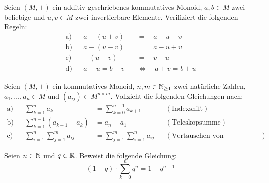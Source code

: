 \begin{aufg}
    Seien $(M,+)$ ein additiv geschriebenes kommutatives Monoid, $a,b\in M$ zwei beliebige und $u,v\in M$ zwei invertierbare Elemente. Verifiziert die folgenden Regeln:
    \begin{align*}
        \text{a)} && a-(u+v) \quad&=\quad a-u-v \\
        \text{b)} && a-(u-v) \quad&=\quad a-u+v \\
        \text{c)} && -(u-v) \quad&=\quad v-u \\
        \text{d)} && a-u=b-v \quad&\Leftrightarrow\quad a+v=b+u
    \end{align*}
\end{aufg}


\begin{comment}
\begin{aufg}[Kürzbarkeit]
    Sei $(M,*)$ ein Monoid. Ein Element $a\in M$ heißt \textbf{kürzbar}, wenn „Multiplikation mit $a$“ eine Äquivalenzumformung ist, d.h. wenn für alle $x,y\in M$ die beiden Äquivalenzen
    \begin{align*}
        a*x& =a*y \quad \leftrightarrow\quad x=y\\
        \text{und}\qquad x*a& =y*a \quad \leftrightarrow\quad x=y
    \end{align*}
    gelten.
    \begin{enumerate}
        \item Beweist, dass jedes invertierbare Element kürzbar ist.
        \item Ist ein kürzbares Element auch immer invertierbar?
    \end{enumerate}
\end{aufg}
\end{comment}


\begin{aufg}  
    Seien $(M,+)$ ein kommutatives Monoid, $n,m\in \mathbb N_{\ge 1}$ zwei natürliche Zahlen, $a_1,\dots , a_n \in M$ und $(a_{ij})\in M^{n\times m}$. Vollzieht die folgenden Gleichungen nach:
    \begin{align*}
        \text{a)} && \sum_{k=1}^n a_k & = \sum_{k=0}^{n-1} a_{k+1} && (\text{Indexshift}) \\
        \text{b)} && \sum_{k=1}^{n-1} (a_{k+1} - a_k) & = a_n - a_1 && (\text{Teleskopsumme}) \\
        \text{c)} && \sum_{i=1}^n \sum_{j=1}^m a_{ij} & = \sum_{j=1}^m \sum_{i=1}^n a_{ij} && (\text{Vertauschen von Doppelsummen})
    \end{align*}
\end{aufg}


\begin{aufg}
    Seien $n\in \mathbb N$ und $q\in \mathbb R$. Beweist die folgende Gleichung:
        \[ (1-q) \cdot \sum_{k=0}^n q^n = 1-q^{n+1} \]
\end{aufg}
